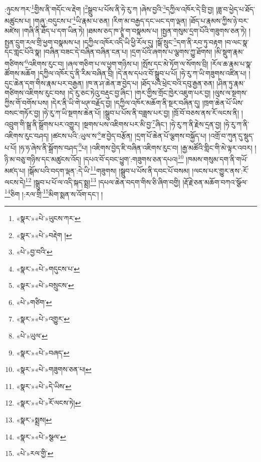 :ཉུངས་ཀར་\footnote{«སྣར་»«པེ་»ཡུངས་ཀར་}གྱིས་ནི་གདོང་ལ་རྡེག །\footnote{«སྣར་»«པེ་»བརྡེག །}སྒྲུབ་པ་པོས་ནི་ཧེ་རུ་ཀ །ཞེས་བྱའི་\footnote{«པེ་»བྱ་བའི་}དཀྱིལ་འཁོར་དེ་བྲི་བྱ། །ཟླ་བ་ཕྱེད་པ་ཐོད་མཚུངས་པ། །གཞུ་:བདུངས་པ་\footnote{«སྣར་»«པེ་»གདུངས་པ་}ཡི་རྣམ་པ་ཅན། །རིག་མ་བརྒྱད་དང་ཡང་དག་ལྡན། །ཐོད་པ་རྣམས་ཀྱིས་ཉེ་བར་མཛེས། །གཞི་ནི་ཐོད་པ་དག་ཡིན་ཏེ། །ཐམས་ཅད་ཁ་ཊྭཱཾ་ག་བསྣམས་པ། །སྤྱན་གསུམ་དྲག་པོའི་གཟུགས་ཅན་ཏེ། །སྤྱན་དྲུག་རལ་གྲི་ཕྱག་བསྣམས་པ། །དཀྱིལ་འཁོར་འདི་ཡི་ཕྱི་རོལ་དུ། །སྒོ་སྲུང་\footnote{«སྣར་»«པེ་»བསྲུངས་}དག་ནི་རབ་ཏུ་བརྟག །བ་ལང་སྣ་དང་གླང་པོའི་སྣ། །བཞིན་བཟང་དེ་བཞིན་བཞིན་ངན་པ། །དྲག་པོའི་ཞགས་པ་ལྕགས་ཀྱུ་ཐོགས། །མི་སྡུག་རྣམ་གཙིགས་\footnote{«པེ་»གཙིག་}འཇིགས་རུང་བ། །ཞལ་གཅིག་པ་ལ་ཕྱག་གཉིས་པ། །སྤོས་དང་མེ་ཏོག་ལ་སོགས་བྲི། །རོལ་ཆ་རྣམ་པ་སྣ་ཚོགས་མཆོག །དཀྱིལ་འཁོར་དུ་ནི་རིམ་བཞིན་བྲི། །དེ་ནས་དཔའ་བོ་སྒྲུབ་པ་པོ། །ཧེ་རུ་ཀ་ཡི་གཟུགས་འཛིན་པ། །དུང་ཆེན་དག་གིས་རྣམ་པར་བརྒྱན། །ཁ་ན་ཤ་ཆེན་ཟ་བྱེད་པ། །ཐོད་པའི་ཕྲེང་བའི་དབུ་རྒྱན་ཅན། །ཤིན་ཏུ་རྣམ་གཙིགས་འཇིགས་རུང་བས། །དེ་རུ་ཅང་ཏེའུ་བརྡུང་བྱ་ཞིང་། །གར་གྱིས་གྲོང་ཁྱེར་འཇུག་པར་བྱ། །ལུས་ལ་སྔགས་ཀྱིས་གོ་བགོས་པས། །དེར་ནི་ཡི་གེ་ཕཊ་བརྗོད་བྱ། །དཀྱིལ་འཁོར་མཆོག་ནི་སྔར་བཞིན་དུ། །ཁྲག་ཆེན་པོ་ཡིས་བསང་གཏོར་བྱ། །ཧེ་རུ་ཀ་ཡི་སྔགས་ཆེན་པོ། །སྒྲུབ་པ་པོས་ནི་བཟླས་པར་བྱ། །ཁྲོ་བོ་བཅས་ནས་རོ་ལངས་ནི། །འབྲུག་གི་སྒྲ་ནི་སྒྲོགས་པར་འགྱུར། །སྔགས་པས་འཇིགས་པར་མི་བྱ་\footnote{«སྣར་»«པེ་»འགྱུར་}ཞིང་། །ཧེ་རུ་ཀ་ནི་རྗེས་དྲན་བྱ། །ཧེ་རུ་ཀ་ནི་འཇིགས་རུང་བཤད། །ཚངས་པའི་:ཡུལ་ས་\footnote{«པེ་»ཡུལ་}ཟ་བྱེད་བརྩོན། །དྲག་པོ་ཆེན་པོ་ལྕགས་བསྐྱོད་པ། །འགྲོ་བ་ཀུན་དུ་སྡུད་པ་པོ། །ཧ་ཧ་ཞེས་ནི་སྒྲོགས་བཤད་\footnote{«སྣར་»«པེ་»བཞད་}པ། །འཇིགས་བྱེད་ཇི་བཞིན་འཇིགས་རུང་བ། །རྒྱ་མཚོའི་གླིང་གི་མེ་ལྟར་འབར། །ཉི་མ་བཅུ་གཉིས་དང་མཚུངས་འོད། །དཔའ་བོ་དབང་ཕྱུག་:གཟུགས་ཅན་དཔའ།\footnote{«སྣར་»«པེ་»གཟུགས་ཅན་པ།} །ཁམས་གསུམ་དག་ནི་གཡོ་མཛད་པ། །སྒོམ་པའི་བདག་ལྡན་:དེ་ཡི་\footnote{«སྣར་»«པེ་»དེ་ཡིས་}གཟུགས། །སྒྲུབ་པ་པོས་ནི་དབང་པོ་བསམ། །ལངས་པར་གྱུར་ནས་:རོ་ལངས་དེ།\footnote{«སྣར་»«པེ་»རོ་ལངས་ཏེ།} །སྒྲུབ་པ་པོ་ལ་འདི་སྐད་སྨྲ།\footnote{«སྣར་»སྨྲས།} །དཔལ་ཆེན་བདག་གིས་ཅི་ཞིག་བགྱི། །རྡོ་རྗེ་ཅན་མཆོག་བཀའ་སྩོལ་\footnote{«སྣར་»«པེ་»སྩལ་}ཅིག །:རལ་གྲི་\footnote{«པེ་»རལ་གྱི་}མིག་སྨན་ས་འོག་དང་། །
